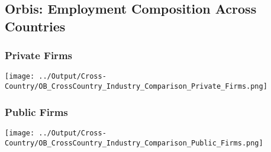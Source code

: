 \documentclass[12pt,notitlepage]{article}
\begin{document}



\subsection{Orbis: Employment Composition Across Countries}

\subsubsection{Private Firms}
\begin{center}
 \texttt{[image: ../Output/Cross-Country/OB\_CrossCountry\_Industry\_Comparison\_Private\_Firms.png]}
\end{center}
\clearpage

\subsubsection{Public Firms}
\begin{center}
 \texttt{[image: ../Output/Cross-Country/OB\_CrossCountry\_Industry\_Comparison\_Public\_Firms.png]}
\end{center}

\clearpage


\FloatBarrier
\end{document}
